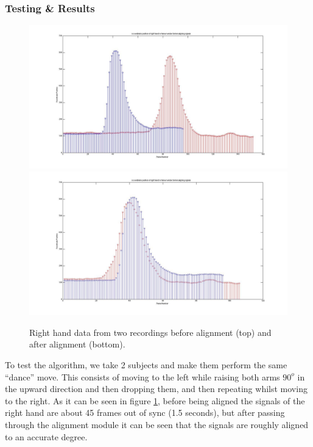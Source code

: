 \documentclass[11pt,a4paper]{article}
\begin{document}
\subsubsection{Testing \& Results}

\begin{figure}[h]
\centering
\includegraphics[scale=0.15]{Initial_Frame_Det_Before.jpg}
\includegraphics[scale=0.15]{Initial_Frame_Det_After.jpg}
\caption{Right hand data from two recordings before alignment (top) and after alignment (bottom).}
\label{pre_post_alginment}
\end{figure}
\noindent
To test the algorithm, we take 2 subjects and make them perform the same ``dance'' move. This consists of moving to the left while raising both arms $90^o$ in the upward direction and then dropping them, and then repeating whilst moving to the right. 
As it can be seen in figure \ref{pre_post_alginment}, before being aligned the signals of the right hand are about 45 frames out of sync (1.5 seconds), but after passing through the alignment module it can be seen that the signals are roughly aligned to an accurate degree. 

\clearpage
\end{document}

